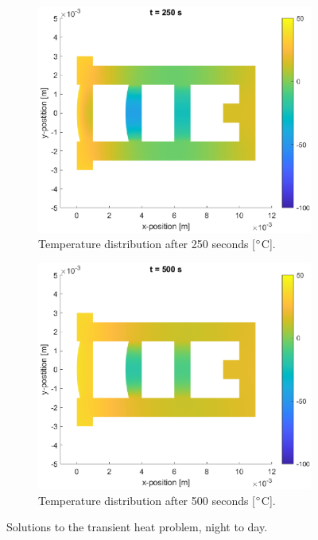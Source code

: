 \documentclass[a4paper,11pt]{article}
\begin{document}
\begin{figure}[H]
    \begin{subfigure}{0.45\linewidth}{
        \centering
        \includegraphics[width=1\linewidth]{BND3.eps}
        \caption{Temperature distribution after 250 seconds [$\degree$C].}
        \label{sub:ND3}
    }\end{subfigure}
    \begin{subfigure}{0.45\linewidth}{
        \centering
        \includegraphics[width=1\linewidth]{bND4.eps}
        \caption{Temperature distribution after 500 seconds [$\degree$C].}
        \label{sub:ND4}
    }\end{subfigure}
    \caption{Solutions to the transient heat problem, night to day.}
    \label{fig:trans_tempND}
\end{figure}
\end{document}

